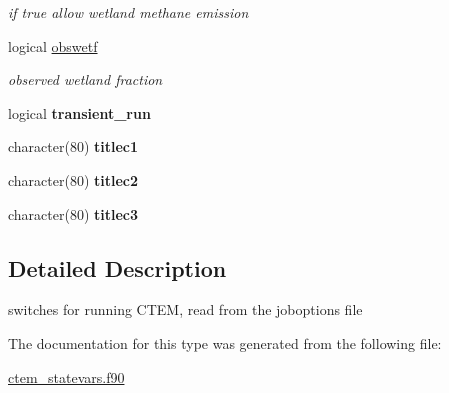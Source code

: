\begin{DoxyCompactItemize}
\begin{DoxyCompactList}\small\item\em if true allow wetland methane emission \end{DoxyCompactList}\item 
\hypertarget{structctem__statevars_1_1ctem__switches_a009ff20d4bbfe0d7435397cf39fda85a}{}logical \hyperlink{structctem__statevars_1_1ctem__switches_a009ff20d4bbfe0d7435397cf39fda85a}{obswetf}\label{structctem__statevars_1_1ctem__switches_a009ff20d4bbfe0d7435397cf39fda85a}

\begin{DoxyCompactList}\small\item\em observed wetland fraction \end{DoxyCompactList}\item 
\hypertarget{structctem__statevars_1_1ctem__switches_a38ff512e235b3dd8a02c05d4d990ab99}{}logical {\bfseries transient\+\_\+run}\label{structctem__statevars_1_1ctem__switches_a38ff512e235b3dd8a02c05d4d990ab99}

\item 
\hypertarget{structctem__statevars_1_1ctem__switches_a4feb503a6f958c0f89f9162fcccc32c7}{}character(80) {\bfseries titlec1}\label{structctem__statevars_1_1ctem__switches_a4feb503a6f958c0f89f9162fcccc32c7}

\item 
\hypertarget{structctem__statevars_1_1ctem__switches_aed3b1557dad2e616fe2349b39e7e7abd}{}character(80) {\bfseries titlec2}\label{structctem__statevars_1_1ctem__switches_aed3b1557dad2e616fe2349b39e7e7abd}

\item 
\hypertarget{structctem__statevars_1_1ctem__switches_a6a2c0c4c8b178c50ee3529251121e6d0}{}character(80) {\bfseries titlec3}\label{structctem__statevars_1_1ctem__switches_a6a2c0c4c8b178c50ee3529251121e6d0}

\end{DoxyCompactItemize}


\subsection{Detailed Description}
switches for running C\+T\+E\+M, read from the joboptions file 

The documentation for this type was generated from the following file\+:\begin{DoxyCompactItemize}
\item 
\hyperlink{ctem__statevars_8f90}{ctem\+\_\+statevars.\+f90}\end{DoxyCompactItemize}

